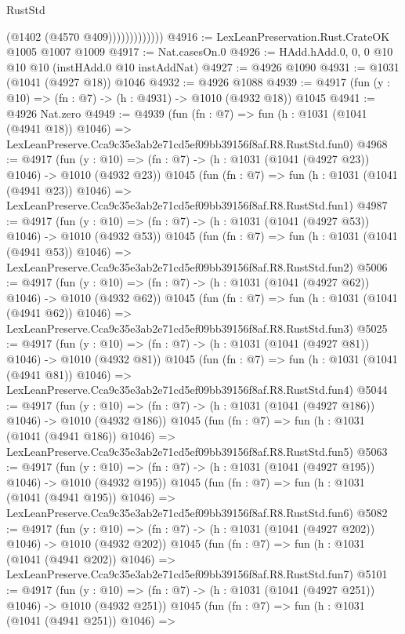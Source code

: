 \begin{lexlean}{RustStd}
\begin{coremodule}
                          (@1402 (@4570 @409)))))))))))))
@4916 := LexLeanPreservation.Rust.CrateOK @1005 @1007 @1009
@4917 := Nat.casesOn.{0}
@4926 := HAdd.hAdd.{0, 0, 0} @10 @10 @10 (instHAdd.{0} @10 instAddNat)
@4927 := @4926 @1090
@4931 := @1031 (@1041 (@4927 @18)) @1046
@4932 := @4926 @1088
@4939 := @4917 (fun (y : @10) => (fn : @7) -> (h : @4931) -> @1010 (@4932 @18)) @1045
@4941 := @4926 Nat.zero
@4949 := @4939
    (fun (fn : @7) =>
    fun (h : @1031 (@1041 (@4941 @18)) @1046) =>
    LexLeanPreserve.Cca9c35e3ab2e71cd5ef09bb39156f8af.R8.RustStd.fun0)
@4968 := @4917
    (fun (y : @10) => (fn : @7) -> (h : @1031 (@1041 (@4927 @23)) @1046) -> @1010 (@4932 @23))
    @1045
    (fun (fn : @7) =>
    fun (h : @1031 (@1041 (@4941 @23)) @1046) =>
    LexLeanPreserve.Cca9c35e3ab2e71cd5ef09bb39156f8af.R8.RustStd.fun1)
@4987 := @4917
    (fun (y : @10) => (fn : @7) -> (h : @1031 (@1041 (@4927 @53)) @1046) -> @1010 (@4932 @53))
    @1045
    (fun (fn : @7) =>
    fun (h : @1031 (@1041 (@4941 @53)) @1046) =>
    LexLeanPreserve.Cca9c35e3ab2e71cd5ef09bb39156f8af.R8.RustStd.fun2)
@5006 := @4917
    (fun (y : @10) => (fn : @7) -> (h : @1031 (@1041 (@4927 @62)) @1046) -> @1010 (@4932 @62))
    @1045
    (fun (fn : @7) =>
    fun (h : @1031 (@1041 (@4941 @62)) @1046) =>
    LexLeanPreserve.Cca9c35e3ab2e71cd5ef09bb39156f8af.R8.RustStd.fun3)
@5025 := @4917
    (fun (y : @10) => (fn : @7) -> (h : @1031 (@1041 (@4927 @81)) @1046) -> @1010 (@4932 @81))
    @1045
    (fun (fn : @7) =>
    fun (h : @1031 (@1041 (@4941 @81)) @1046) =>
    LexLeanPreserve.Cca9c35e3ab2e71cd5ef09bb39156f8af.R8.RustStd.fun4)
@5044 := @4917
    (fun (y : @10) => (fn : @7) -> (h : @1031 (@1041 (@4927 @186)) @1046) -> @1010 (@4932 @186))
    @1045
    (fun (fn : @7) =>
    fun (h : @1031 (@1041 (@4941 @186)) @1046) =>
    LexLeanPreserve.Cca9c35e3ab2e71cd5ef09bb39156f8af.R8.RustStd.fun5)
@5063 := @4917
    (fun (y : @10) => (fn : @7) -> (h : @1031 (@1041 (@4927 @195)) @1046) -> @1010 (@4932 @195))
    @1045
    (fun (fn : @7) =>
    fun (h : @1031 (@1041 (@4941 @195)) @1046) =>
    LexLeanPreserve.Cca9c35e3ab2e71cd5ef09bb39156f8af.R8.RustStd.fun6)
@5082 := @4917
    (fun (y : @10) => (fn : @7) -> (h : @1031 (@1041 (@4927 @202)) @1046) -> @1010 (@4932 @202))
    @1045
    (fun (fn : @7) =>
    fun (h : @1031 (@1041 (@4941 @202)) @1046) =>
    LexLeanPreserve.Cca9c35e3ab2e71cd5ef09bb39156f8af.R8.RustStd.fun7)
@5101 := @4917
    (fun (y : @10) => (fn : @7) -> (h : @1031 (@1041 (@4927 @251)) @1046) -> @1010 (@4932 @251))
    @1045
    (fun (fn : @7) =>
    fun (h : @1031 (@1041 (@4941 @251)) @1046) =>

\end{coremodule}
\end{lexlean}
